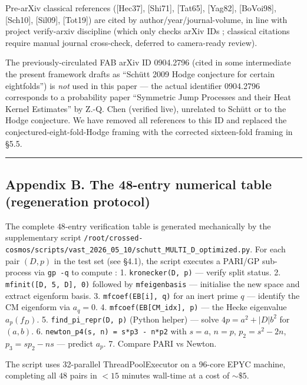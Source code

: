 \documentclass[
  11pt,
  a4paper,
]{amsart}
\begin{document}
Pre-arXiv classical references ({[}Hec37{]}, {[}Shi71{]}, {[}Tat65{]}, {[}Yag82{]}, {[}BoVoi98{]}, {[}Sch10{]}, {[}Sil09{]}, {[}Tot19{]}) are cited by author/year/journal-volume, in line with project verify-arxiv discipline (which only checks arXiv IDs ; classical citations require manual journal cross-check, deferred to camera-ready review).

The previously-circulated FAB arXiv ID 0904.2796 (cited in some intermediate the present framework drafts as ``Schütt 2009 Hodge conjecture for certain eightfolds'') is \emph{not} used in this paper --- the actual identifier 0904.2796 corresponds to a probability paper ``Symmetric Jump Processes and their Heat Kernel Estimates'' by Z.-Q. Chen (verified live), unrelated to Schütt or to the Hodge conjecture. We have removed all references to this ID and replaced the conjectured-eight-fold-Hodge framing with the corrected sixteen-fold framing in §5.5.

\begin{center}\rule{0.5\linewidth}{0.5pt}\end{center}

\hypertarget{appendix-b.-the-48-entry-numerical-table-regeneration-protocol}{%
\subsection{Appendix B. The 48-entry numerical table (regeneration protocol)}\label{appendix-b.-the-48-entry-numerical-table-regeneration-protocol}}

The complete \(48\)-entry verification table is generated mechanically by the supplementary script \texttt{/root/crossed-cosmos/scripts/vast\_2026\_05\_10/schutt\_MULTI\_D\_optimized.py}. For each pair \((D, p)\) in the test set (see §4.1), the script executes a PARI/GP sub-process via \texttt{gp\ -q} to compute :
1. \texttt{kronecker(D,\ p)} --- verify split status.
2. \texttt{mfinit({[}\textbar{}D\textbar{},\ 5,\ D{]},\ 0)} followed by \texttt{mfeigenbasis} --- initialise the new space and extract eigenform basis.
3. \texttt{mfcoef(EB{[}i{]},\ q)} for an inert prime \(q\) --- identify the CM eigenform via \(a_q = 0\).
4. \texttt{mfcoef(EB{[}CM\_idx{]},\ p)} --- the Hecke eigenvalue \(a_p(f_D)\).
5. \texttt{find\_pi\_repr(D,\ p)} (Python helper) --- solve \(4 p = a^2 + |D| b^2\) for \((a, b)\).
6. \texttt{newton\_p4(s,\ n)\ =\ s*p3\ -\ n*p2} with \(s = a\), \(n = p\), \(p_2 = s^2 - 2n\), \(p_3 = s p_2 - n s\) --- predict \(a_p\).
7. Compare PARI vs Newton.

The script uses 32-parallel ThreadPoolExecutor on a 96-core EPYC machine, completing all \(48\) pairs in \(< 15\) minutes wall-time at a cost of \(\sim \$5\).
\end{document}
